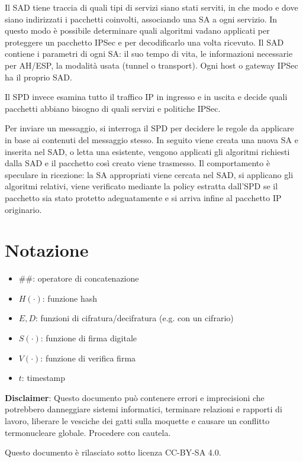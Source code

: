 \documentclass[answers, a4paper, 11pt]{exam}
\begin{document}
\begin{questions}
\begin{parts}
\begin{solution}
Il SAD tiene traccia di quali tipi di servizi siano stati serviti, in che modo e dove siano indirizzati i pacchetti coinvolti, associando una SA a ogni servizio.
In questo modo è possibile determinare quali algoritmi vadano applicati per proteggere un pacchetto IPSec e per decodificarlo una volta ricevuto. 
Il SAD contiene i parametri di ogni SA: il suo tempo di vita, le informazioni necessarie per AH/ESP, la modalità usata (tunnel o transport). 
Ogni host o gateway IPSec ha il proprio SAD. 

Il SPD invece esamina tutto il traffico IP in ingresso e in uscita e decide quali pacchetti abbiano bisogno di quali servizi e politiche IPSec.

Per inviare un messaggio, si interroga il SPD per decidere le regole da applicare in base ai contenuti del messaggio stesso.
In seguito viene creata una nuova SA e inserita nel SAD, o letta una esistente, vengono applicati gli algoritmi richiesti dalla SAD e il pacchetto così creato viene trasmesso. 
Il comportamento è speculare in ricezione: la SA appropriati viene cercata nel SAD, si applicano gli algoritmi relativi, viene verificato mediante la policy estratta dall'SPD se il pacchetto sia stato protetto adeguatamente e si arriva infine al pacchetto IP originario. 
\end{solution}
\end{parts}

\end{questions}

\section*{Notazione}
\begin{itemize}
\item $\#\#$: operatore di concatenazione
\item $H(\cdot)$: funzione hash
\item $E, D$: funzioni di cifratura/decifratura (e.g. con un cifrario)
\item $S(\cdot)$: funzione di firma digitale
\item $V(\cdot)$: funzione di verifica firma
\item $t$: timestamp

\end{itemize}
\textbf{Disclaimer}:  Questo documento può contenere errori e imprecisioni che potrebbero danneggiare sistemi informatici, terminare relazioni e rapporti di lavoro, liberare le vesciche dei gatti sulla moquette e causare un conflitto termonucleare globale.
Procedere con cautela.

Questo documento è rilasciato sotto licenza CC-BY-SA 4.0. \ccbysa
\end{document}
